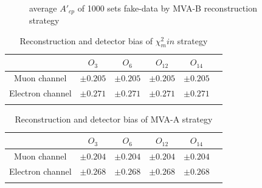 		\begin{figure}[H]
			\centering
				\\
		\caption{average $A'_{cp}$ of 1000 sets fake-data by MVA-B reconstruction strategy}
		\label{AsymBias:fig:a05_noMlbcut_DetBias}
		\end{figure}
		\FloatBarrier


		\begin{center}
		\begin{longtable}[H]{ c c c c c c }
		\caption{Reconstruction and detector bias of $\chi^2_min$ strategy}\\
		\hline
		[\%] & $O_{3}$ & $O_{6}$ & $O_{12}$ & $O_{14}$ \\ 
		\hline{}
		Muon channel & $\pm0.205$ & $\pm0.205$ & $\pm0.205$ & $\pm0.205$ \\
		Electron channel & $\pm0.271$ & $\pm0.271$ & $\pm0.271$ & $\pm0.271$ \\
		\hline
		\label{AsymBias:tb:chi2_DetBias}
		\end{longtable}
		\end{center}

		\begin{center}
		\begin{longtable}[H]{ c c c c c c }
		\caption{Reconstruction and detector bias of MVA-A strategy}\\
		\hline
		[\%] & $O_{3}$ & $O_{6}$ & $O_{12}$ & $O_{14}$ \\ 
		\hline{}
		Muon channel & $\pm0.204$ & $\pm0.204$ & $\pm0.204$ & $\pm0.204$ \\
		Electron channel & $\pm0.268$ & $\pm0.268$ & $\pm0.268$ & $\pm0.268$ \\
		\hline
		\label{AsymBias:tb:a05_Mlbcut_DetBias}
		\end{longtable}
		\end{center}

